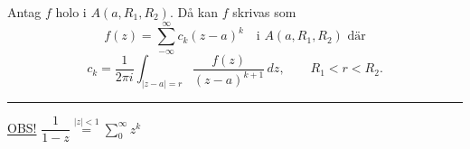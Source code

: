 \begin{theorem}
Antag $f$ holo i $A(a, R_1, R_2)$. Då kan $f$ skrivas som
\[ f(z) = \sum_{-\infty}^\infty c_k(z - a)^k \quad \text{i } A(a, R_1, R_2) \text{ där} \]
\[ c_k = \frac{1}{2\pi i}\int_{|z - a| = r} \frac{f(z)}{(z - a)^{k + 1}}\,dz, \qquad R_1 < r < R_2. \]
\end{theorem}

\noindent\rule{\linewidth}{0.4pt}

\underline{OBS!} \quad $\dfrac{1}{1 - z} \overset{|z| < 1}{=} \displaystyle\sum_0^\infty z^k$
